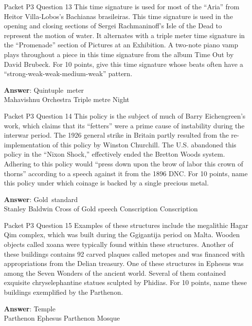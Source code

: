 \begin{frame}{Packet P3 Question 13}
This time signature is     used for most of the   ``Aria'' from Heitor Villa-Lobos's Bachianas brasileiras. This time signature is used in the opening and closing sections of Sergei Rachmaninoff's Isle of the Dead to represent the motion of water. It alternates with a triple meter time signature in the ``Promenade'' section of Pictures at an Exhibition. A two-note piano vamp plays throughout a piece in this time signature from the album Time Out by David Brubeck. For 10 points, give this time signature whose beats often have a ``strong-weak-weak-medium-weak'' pattern.  

\textbf{Answer}: Quintuple\ meter\\
 Mahavishnu Orchestra
 Triple metre
 Night
\end{frame}

\begin{frame}{Packet P3 Question 14}
This policy is the subject of much of Barry Eichengreen's work, which claims that its ``fetters'' were a prime cause of instability during the interwar period. The   1926 general strike in Britain partly resulted from the re-implementation of this policy by Winston Churchill. The U.S. abandoned this policy in the ``Nixon Shock,'' effectively ended the Bretton Woods system. Adhering to this policy would ``press down upon the brow of labor this crown of thorns'' according to a speech against it from the 1896 DNC. For 10 points, name this policy under which coinage is backed by a single precious metal.      

\textbf{Answer}: Gold\ standard\\
 Stanley Baldwin
 Cross of Gold speech
 Conscription
 Conscription
\end{frame}

\begin{frame}{Packet P3 Question 15}
Examples of these structures include the megalithic Hagar Qim complex, which was built during the Ggigantija period on Malta. Wooden objects called xoana were typically found within these structures. Another of these buildings contains 92 carved plaques called metopes and was financed with appropriations from the Delian treasury. One of these structures in Ephesus was among the Seven Wonders of the ancient world. Several of them contained exquisite chryselephantine statues sculpted by Phidias. For   10 points, name these buildings exemplified by the Parthenon.      

\textbf{Answer}: Temple\\
 Parthenon
 Ephesus
 Parthenon
 Mosque
\end{frame}

